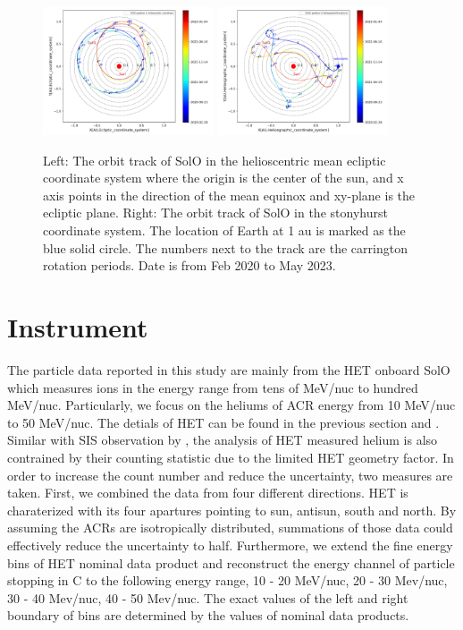 \begin{figure}
    \centering
    \includegraphics[width=0.45\textwidth]{images/ACR/SOLO_orbit_track_helioscentric_3.png}
    \includegraphics[width = 0.45\textwidth]{images/ACR/SOLO_orbit_stonyhurst_3.png}
    \caption[Orbit track of \ac{Solo}]{Left: The orbit track of \ac{SolO} in the helioscentric mean ecliptic coordinate system where the origin is the center of the sun, and x axis points in the direction of the mean equinox and xy-plane is the ecliptic plane. Right: The orbit track of \ac{SolO} in the stonyhurst coordinate system. The location of Earth at 1 au is marked as the blue solid circle. The numbers next to the track are the carrington rotation periods.
    Date is from Feb 2020 to May 2023.}
    \label{fig:SOLO_orbit_track}
\end{figure}




\section{Instrument}


The particle data reported in this study are mainly from the \acl{HET} onboard \ac{SolO} which measures ions in the energy range from tens of MeV/nuc to hundred MeV/nuc. Particularly, we focus on the heliums of \ac{ACR} energy from 10 MeV/nuc to 50 MeV/nuc. The detials of \ac{HET} can be found in the previous section and \citet{RodriguezPacheco-2019-EPD}.
Similar with \ac{SIS} observation by \citet{Mason-2021-SolOQuietTime}, the analysis of \ac{HET} measured helium is also contrained by their counting statistic due to the limited \ac{HET} geometry factor. In order to increase the count number and reduce the uncertainty, two measures are taken. First, we combined the data from four different directions. \ac{HET} is charaterized with its four apartures pointing to sun, antisun, south and north. By assuming the \acp{ACR} are isotropically distributed, summations of those data could effectively reduce the uncertainty to half. Furthermore, we extend the fine energy bins of \ac{HET} nominal data product and reconstruct the energy channel of particle stopping in C to the following energy range, 10 - 20 MeV/nuc, 20 - 30 Mev/nuc, 30 - 40 Mev/nuc, 40 - 50 Mev/nuc. The exact values of the left and right boundary of bins are determined by the values of nominal data products.

